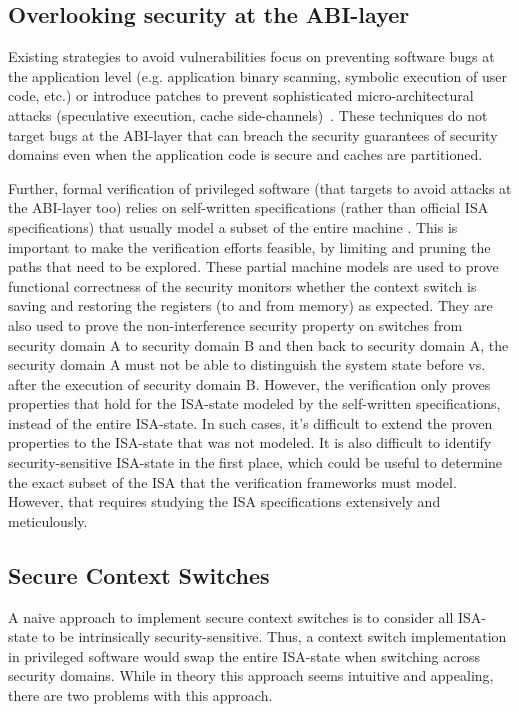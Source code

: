 \subsection{Overlooking security at the ABI-layer}

Existing strategies to avoid vulnerabilities focus on preventing software bugs at the application level (e.g. application binary scanning, symbolic execution of user code, etc.) or introduce patches to prevent sophisticated micro-architectural attacks (speculative execution, cache side-channels)~\cite{spectre, meltdown,flush-reload}. 
These techniques do not target bugs at the ABI-layer that can breach the security guarantees of security domains even when the application code is secure and caches are partitioned. 

Further, formal verification of privileged software (that targets to avoid attacks at the ABI-layer too) relies on self-written specifications (rather than official ISA specifications) that usually model a subset of the entire machine \cite{serval, komodo, certikos}.
This is important to make the verification efforts feasible, by limiting and pruning the paths that need to be explored. 
These partial machine models are used to prove functional correctness of the security monitors \ie{} whether the context switch is saving and restoring the registers (to and from memory) as expected.
They are also used to prove the non-interference security property \ie{} on switches from security domain A to security domain B and then back to security domain A, the security domain A must not be able to distinguish the system state before vs. after the execution of security domain B. 
However, the verification only proves properties that hold for the ISA-state modeled by the self-written specifications, instead of the entire ISA-state. 
In such cases, it's difficult to extend the proven properties to the ISA-state that was not modeled.
It is also difficult to identify security-sensitive ISA-state in the first place, which could be useful to determine the exact subset of the ISA that the verification frameworks must model. 
However, that requires studying the ISA specifications extensively and meticulously. 

\subsection{Secure Context Switches}
A naive approach to implement secure context switches is to consider all ISA-state to be intrinsically security-sensitive.
Thus, a context switch implementation in privileged software would swap the entire ISA-state when switching across security domains. 
While in theory this approach seems intuitive and appealing, there are two problems with this approach.

